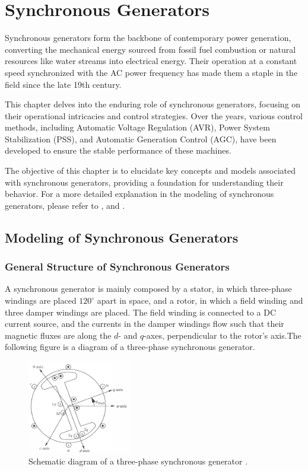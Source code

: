 \chapter{Synchronous Generators}

Synchronous generators form the backbone of contemporary power generation,
converting the mechanical energy sourced from fossil fuel combustion or natural
resources like water streams into electrical energy. Their operation at a
constant speed synchronized with the AC power frequency has made them a staple
in the field since the late 19th century.

This chapter delves into the enduring role of synchronous generators, focusing
on their operational intricacies and control strategies. Over the years, various
control methods, including Automatic Voltage Regulation (AVR), Power System
Stabilization (PSS), and Automatic Generation Control (AGC), have been developed
to ensure the stable performance of these machines.

The objective of this chapter is to elucidate key concepts and models associated
with synchronous generators, providing a foundation for understanding their
behavior. For a more detailed explanation in the modeling of synchronous generators,
please refer to \cite{sauer2017power},\cite{krause2002analysis} and \cite{siva2022modeling}.

\section{Modeling of Synchronous Generators}
\subsection{General Structure of Synchronous Generators}

A synchronous generator is mainly composed by a stator, in which three-phase
windings are placed $120^{\circ}$ apart in space, and a rotor, in which a field
winding and three damper windings are placed. The field winding is connected to
a DC current source, and the currents in the damper windings flow such that
their magnetic fluxes are along the $d$- and $q$-axes, perpendicular to the
rotor's axis.The following figure is a diagram of a three-phase synchronous
generator.

\begin{figure}[!ht]
    \centering
    \includegraphics[width = 0.4\textwidth]{images/sg-schematic.png}
    \caption{Schematic diagram of a three-phase synchronous generator \cite{sauer2017power}.}
    \label{fig:sg-schematic}
\end{figure}

